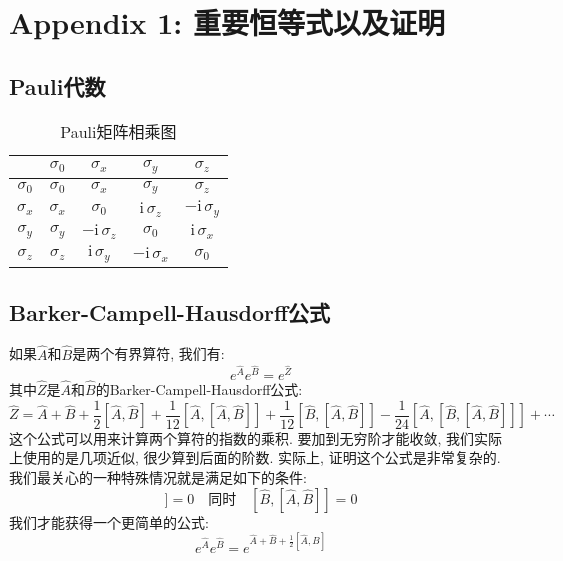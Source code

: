 \chapter{Appendix 1: 重要恒等式以及证明}

\section{Pauli代数}
\begin{table}[htbp!]
	\centering
	\begin{tabular}{c|cccc}
	& $\sigma_0$ & $\sigma_x$ & $\sigma_y$ & $\sigma_z$\\
	\hline
	$\sigma_0$ & $\sigma_0$ & $\sigma_x$ & $\sigma_y$ & $\sigma_z$\\
	$\sigma_x$ & $\sigma_x$ & $\sigma_0$ & $\mathrm{i}\,\sigma_z$ & $-\mathrm{i}\,\sigma_y$\\
	$\sigma_y$ & $\sigma_y$ & $-\mathrm{i}\,\sigma_z$ & $\sigma_0$ & $\mathrm{i}\,\sigma_x$\\
	$\sigma_z$ & $\sigma_z$ & $\mathrm{i}\,\sigma_y$ & $-\mathrm{i}\,\sigma_x$ & $\sigma_0$
	\end{tabular}
  \label{Tab: Appendix_1_Pauli_Matrix_Multiplication}
	\caption{Pauli矩阵相乘图}
\end{table}

\section{Barker-Campell-Hausdorff公式}
如果$\hat{A}$和$\hat{B}$是两个有界算符, 我们有:
\begin{equation}
	e^{\hat{A}} e^{\hat{B}} = e^{\hat{Z}}
\end{equation}
其中$\hat{Z}$是$\hat{A}$和$\hat{B}$的Barker-Campell-Hausdorff公式:
\begin{equation}
	\hat{Z} = \hat{A} + \hat{B} + \frac{1}{2} [\hat{A}, \hat{B}] + \frac{1}{12} [\hat{A}, [\hat{A}, \hat{B}]] + \frac{1}{12} [\hat{B}, [\hat{A}, \hat{B}]] - \frac{1}{24} [\hat{A}, [\hat{B}, [\hat{A}, \hat{B}]]] + \cdots
\end{equation}
这个公式可以用来计算两个算符的指数的乘积. 要加到无穷阶才能收敛, 我们实际上使用的是几项近似, 很少算到后面的阶数.
实际上, 证明这个公式是非常复杂的.
我们最关心的一种特殊情况就是满足如下的条件:
\begin{equation}
	[\hat{A}, [\hat{A}, \hat{B}]] = 0 \quad \text{同时} \quad [\hat{B}, [\hat{A}, \hat{B}]] = 0
\end{equation}
我们才能获得一个更简单的公式:
\begin{equation}
	e^{\hat{A}} e^{\hat{B}} = e^{\hat{A} + \hat{B} + \frac{1}{2} [\hat{A}, \hat{B}]}
\end{equation}